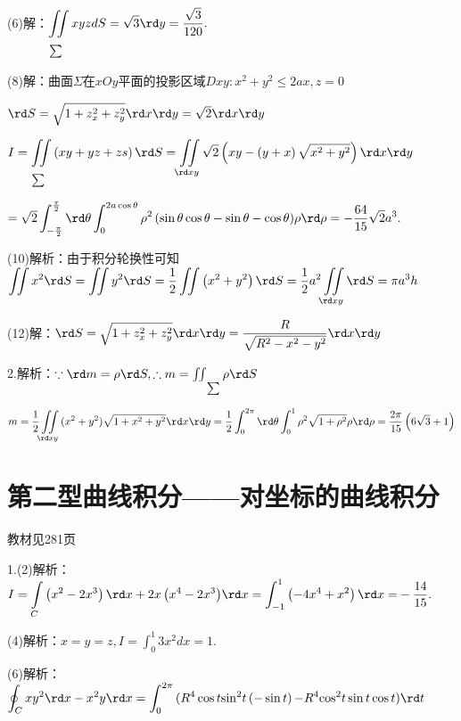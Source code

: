   (6)解：$\displaystyle\iint\limits_\sum {xyzdS = \sqrt 3 } \rd y = \dfrac{{\sqrt 3 }}{{120}}.$

  (8)解：曲面$\Sigma$在$xOy$平面的投影区域$Dxy:{x^2} + {y^2} \le 2ax,z = 0$

   $\rd S = \sqrt {1 + z_x^2 + z_y^2} \rd x\rd y = \sqrt 2 \rd x\rd y$

   $I = \displaystyle\iint\limits_\sum  {\left( {xy + yz + zs} \right)\rd S = \iint\limits_{\rd xy} {\sqrt 2 \left( {xy - \left( {y + x} \right)\sqrt {{x^2} + {y^2}} } \right)\rd x\rd y}}$

   $= \sqrt 2 \displaystyle\int_{ - \frac{\pi }{2}}^{\frac{\pi }{2}} {\rd \theta \displaystyle\int_0^{2a\cos \theta } {{\rho ^2}\left( {\sin \theta \cos \theta  - \sin \theta  - \cos \theta } \right)} } \rho \rd \rho  =  - \dfrac{{64}}{{15}}\sqrt 2 {a^3}.$

  (10)解析：由于积分轮换性可知
    $\displaystyle\iint {{x^2}\rd S = \iint {{y^2}\rd S = \dfrac{1}{2}\iint {\left( {{x^2} + {y^2}} \right)\rd S}}}
    = \dfrac{1}{2}{a^2}\iint\limits_{\rd xy} {\rd S = \pi {a^3}h}$

  (12)解：$\rd S = \sqrt {1 + z_x^2 + z_y^2} \rd x\rd y = \dfrac{R}{{\sqrt {{R^2} - {x^2} - {y^2}} }}\rd x\rd y$

  2.解析：$\because \rd m = \rho \rd S,\therefore m = \iint\limits_\sum  {\rho \rd S}$

  $m = \dfrac{1}{2}\displaystyle\iint\limits_{\rd xy} {({x^2} + {y^2})\sqrt {1 + {x^2} + {y^2}} }\rd x\rd y = \dfrac{1}{2}\displaystyle\int_0^{2\pi } {\rd \theta } \displaystyle\int_0^1 {{\rho ^2}} \sqrt {1 + {\rho ^2}} \rho \rd \rho  = \dfrac{{2\pi }}{{15}}\left( {6\sqrt 3  + 1} \right)$

\section{第二型曲线积分——对坐标的曲线积分}
\begin{flushright}
  \color{zhanqing!80}
   教材见281页
\end{flushright}

  1.(2)解析：$I = \displaystyle\int\limits_C {\left( {{x^2} - 2{x^3}} \right)\rd x + 2x\left( {{x^4} - 2{x^3}} \right)} \rd x = \displaystyle\int_{ - 1}^1 {\left( { - 4{x^4} + {x^2}} \right)\rd x = }  - \dfrac{{14}}{{15}}.$

  (4)解析：$x = y = z,I = \displaystyle\int_0^1 {3{x^2}dx = 1.}$

  (6)解析：$\displaystyle\oint_C {x{y^2}\rd x - {x^2}y\rd x = \displaystyle\int_0^{2\pi } {({R^4}\cos t{{\sin }^2}t\left( { - \sin t} \right) - } } {R^4}{\cos ^2}t\sin t\cos t)\rd t$

